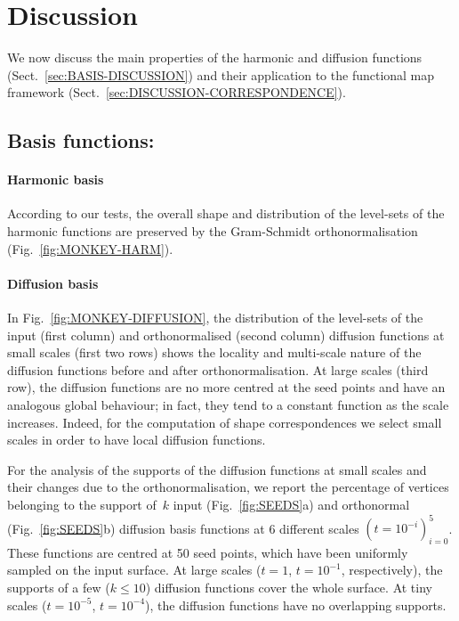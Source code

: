 \documentclass[acmtog,authorversion]{acmart}
\begin{document}
\section{Discussion\label{sec:DISCUSSION}}
We now discuss the main properties of the harmonic and diffusion functions (Sect.~\ref{sec:BASIS-DISCUSSION}) and their application to the functional map framework (Sect.~\ref{sec:DISCUSSION-CORRESPONDENCE}).

\subsection{Basis functions: \label{sec:BASIS-DISCUSSION}}
%
\paragraph*{Harmonic basis}
According to our tests, the overall shape and distribution of the level-sets of the harmonic functions are preserved by the Gram-Schmidt orthonormalisation (Fig.~\ref{fig:MONKEY-HARM}).

\paragraph*{Diffusion basis}
In Fig.~\ref{fig:MONKEY-DIFFUSION}, the distribution of the level-sets of the input (first column) and orthonormalised (second column) diffusion functions at small scales (first two rows) shows the locality and multi-scale nature of the diffusion functions before and after orthonormalisation. At large scales (third row), the diffusion functions are no more centred at the seed points and have an analogous global behaviour; in fact, they tend to a constant function as the scale increases. Indeed, for the computation of shape correspondences we select small scales in order to have local diffusion functions.
 
For the analysis of the supports of the diffusion functions at small scales and their changes due to the orthonormalisation, we report the percentage of vertices belonging to the support of~$k$ input (Fig.~\ref{fig:SEEDS}a) and orthonormal (Fig.~\ref{fig:SEEDS}b) diffusion basis functions at 6 different scales \mbox{$(t=10^{-i})_{i=0}^{5}$}. These functions are centred at 50 seed points, which have been uniformly sampled on the input surface. At large scales (\mbox{$t=1$}, \mbox{$t=10^{-1}$}, respectively), the supports of a few (\mbox{$k\leq10$}) diffusion functions cover the whole surface. At tiny scales (\mbox{$t=10^{-5}$}, \mbox{$t=10^{-4}$}), the diffusion functions have no overlapping supports. 
\end{document}
